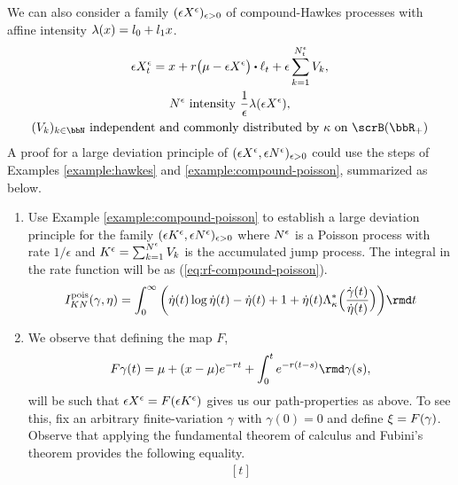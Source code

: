 \begin{example}
  \label{example:compound-hawkes}
  We can also consider a family $(\epsilon X^\epsilon)_{\epsilon>0}$ of compound-Hawkes processes with affine intensity $\lambda(x) = l_0 + l_1 x$.
  \begin{gather*}
    \Xe_t = \stateVar + \hawkesRate\big(\mu - \Xe\big) \shortInt \leb_t + \epsilon \sum_{k=1}^{N^\epsilon_t} \V_k, \\
    \N^\epsilon \text{ intensity } \frac1\epsilon\affInt(\Xe), \\
    (\V_k)_{k\in\bbN} \text{ independent and commonly distributed by } \affDist \text{ on } \scrB(\bbR_+)
  \end{gather*}
  A proof for a large deviation principle of $(\epsilon X^\epsilon, \epsilon N^\epsilon)_{\epsilon>0}$ could use the steps of Examples \ref{example:hawkes} and \ref{example:compound-poisson}, summarized as below.
  \begin{enumerate}
    \item
      Use Example \ref{example:compound-poisson} to establish a large deviation principle for the family $(\epsilon K^\epsilon, \epsilon N^\epsilon)_{\epsilon>0}$ where $N^\epsilon$ is a Poisson process with rate $1/\epsilon$ and $K^\epsilon = \sum_{k=1}^{N^\epsilon} V_k$ is the accumulated jump process.
      The integral in the rate function will be as (\ref{eq:rf-compound-poisson}).
      \begin{equation*}
        \rf_{K\N}^\text{pois}(\gamma, \eta) = \int_0^\infty \bigg( \dot\eta(t) \log \dot\eta(t) - \dot\eta(t) + 1 + \dot\eta(t) \ode_\affDist^*\Big(\frac{\dot\gamma(t)}{\dot\eta(t)} \Big) \bigg) \rmd t
      \end{equation*}
    \item
      We observe that defining the map $F$,
      \begin{equation*}
        F\gamma(t) = \mu + (\stateVar - \mu)e^{-\hawkesRate t} + \int_0^t e^{-\hawkesRate(t-s)} \rmd\gamma(s),
      \end{equation*}
      will be such that $\epsilon X^\epsilon = F(\epsilon K^\epsilon)$ gives us our path-properties as above.
      To see this, fix an arbitrary finite-variation $\gamma$ with $\gamma(0) = 0$ and define $\xi = F(\gamma)$.
      Observe that applying the fundamental theorem of calculus and Fubini's theorem provides the following equality.
      \begin{equation}
        \label{eq:most-annoying-thing-ever}
        \begin{aligned}[t]

\end{aligned}
\end{equation}
\end{enumerate}
\end{example}
